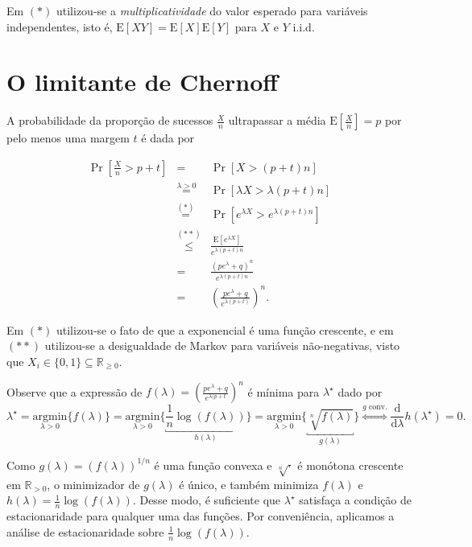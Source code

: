 \documentclass{article}
\begin{document}
Em \((*)\) utilizou-se a \emph{multiplicatividade} do valor esperado para variáveis independentes, isto é, \(\mathrm{E}\left[XY\right] = \mathrm{E}\left[X\right]\mathrm{E}\left[Y\right]\) para \(X\) e \(Y\) i.i.d. 

\newpage

\section*{O limitante de Chernoff}

A probabilidade da proporção de sucessos \(\frac{X}{n}\) ultrapassar a média \(\mathrm E\left[\frac{X}{n}\right] = p\) por pelo menos uma margem \(t\) é dada por

\begin{equation}\label{calc:prob}
	\begin{array}{rcl}
		\Pr\left[\frac{X}{n} > p + t\right] & = & \Pr[X > (p+t)n]\\[1em]
		& \overset{\lambda > 0}{=} & \Pr\left[\lambda X > \lambda (p+t)n\right]\\[1em]
		& \overset{(*)}{=} & \Pr\left[e^{\lambda X} > e^{ \lambda (p+t) n}\right]\\[1em]
		& \overset{(**)}{\leq} & \frac{\mathrm E \left[e^{\lambda X}\right]}{ e^{\lambda(p+t)n}}\\[1em]
		& = & \frac{\left(pe^{\lambda}+q\right)^n}{e^{\lambda(p+t)n}}\\[1em]
		& = & \left(\frac{pe^{\lambda}+q}{e^{\lambda(p+t)}}\right)^n.
	\end{array}
\end{equation}

Em \((*)\) utilizou-se o fato de que a exponencial é uma função crescente, e em \((**)\) utilizou-se a desigualdade de Markov para variáveis não-negativas, visto que \(X_i\in\{0,1\}\subseteq\mathbb{R}_{\geq 0}\).

Observe que a expressão de \(f(\lambda) = \left(\frac{pe^\lambda+q}{e^{\lambda(p+t}}\right)^n\) é mínima para \(\lambda^\star\) dado por
\[
\lambda^\star = \underset{\lambda > 0}{\mathrm{argmin}}\{f(\lambda)\} = \underset{\lambda > 0}{\mathrm{argmin}}\bigg\{\underbracket{\frac{1}{n}\log(f(\lambda))}_{h(\lambda)}\bigg\} = \underset{\lambda > 0}{\mathrm{argmin}}\{\underbracket{\sqrt[n]{f(\lambda)}}_{g(\lambda)}\}  \overset{g \text{ conv.}}{\iff} \frac{\mathrm d}{\mathrm d\lambda} h(\lambda^\star) = 0. 
\]

Como \(g(\lambda) = (f(\lambda))^{1/n}\) é uma função convexa e \(\sqrt[n]{\cdot}\) é monótona crescente em \(\mathbb{R}_{>0}\), o minimizador de \(g(\lambda)\) é único, e também minimiza \(f(\lambda)\) e \(h(\lambda)=\frac{1}{n}\log(f(\lambda))\). Desse modo, é suficiente que \(\lambda^\star\) satisfaça a condição de estacionaridade para qualquer uma das funções. Por conveniência, aplicamos a análise de estacionaridade sobre \(\frac{1}{n}\log(f(\lambda))\).
\end{document}

